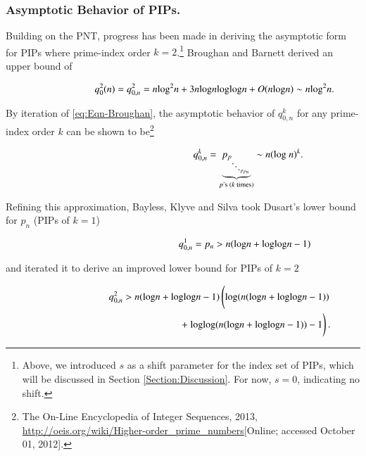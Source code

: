 \documentclass[12pt,longtitle,times]{amsart}
\begin{document}
\subsubsection[short]{Asymptotic Behavior of PIPs.} Building on the PNT, progress has been made in deriving the asymptotic form for PIPs where prime-index order $k=2$.\footnote{Above, we introduced $s$ as a shift parameter for the index set of PIPs, which will be discussed in Section \ref{Section:Discussion}. For now, $s=0$, indicating no shift.} Broughan and Barnett \cite{Broughan2009} derived an upper bound of 

\begin{equation}\label{eq:Eqn-Broughan}
\hphantom{--------}q_{0}^2(n)=q_{0,n}^2 = n\text{log}^2n + 3n\text{log}n\text{log}\text{log}n+O(n\text{log}n) \sim n\text{log}^2n.
\end{equation}

By iteration of \eqref{eq:Eqn-Broughan}, the asymptotic behavior of $q_{0,n}^k$ for any prime-index order $k$ can be shown to be\footnote{The On-Line Encyclopedia of Integer Sequences, 2013, \url{http://oeis.org/wiki/Higher-order_prime_numbers}[Online; accessed October 01, 2012].}

\begin{equation}\label{eq:Eqn-Wiki-asymp-q}
\hphantom{----------------}q_{0,n}^k = \underbrace{p_{p_{\ddots_{p_{p_n}}}}}_{\text{$p$'s ($k$ times)}} \sim{} n(\text{log\space}n)^k.
\end{equation}
   
Refining this approximation, Bayless, Klyve and Silva\cite{Bayless2013} took Dusart's lower bound for $p_n$ (PIPs of $k=1$)

\begin{equation}\label{eq:Bayless-iteration-1}
\hphantom{---------------}q_{0,n}^1 = p_n > n(\text{log}n + \text{log}\text{log}n-1) 
\end{equation}

and iterated it to derive an improved lower bound for PIPs of $k=2$  
 
\begin{singlespace} 
\begin{eqnarray}\label{eq:Bayless-iteration-2}
\hphantom{---------}q_{0,n}^2 > n(\text{log}n + \text{log}\text{log}n-1)\left(\vphantom{p\ddots_p\ddots}\text{log}(n(\text{log}n + \text{log}\text{log}n-1) )\right. \\
\left.+\text{ }\vphantom{p\ddots_p\ddots}\text{log}\text{log}(n(\text{log}n + \text{log}\text{log}n-1))-1\right).\nonumber
\end{eqnarray}
\end{singlespace}
\end{document}

